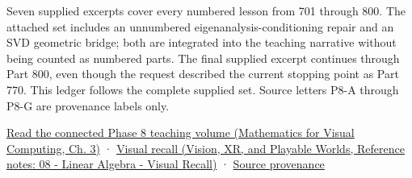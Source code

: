 \hypertarget{appendix-fd090d982a15-phase-8---parts-701-800}{}

Seven supplied excerpts cover every numbered lesson from 701 through 800. The attached set includes an unnumbered eigenanalysis-conditioning repair and an SVD geometric bridge; both are integrated into the teaching narrative without being counted as numbered parts. The final supplied excerpt continues through Part 800, even though the request described the current stopping point as Part 770. This ledger follows the complete supplied set. Source letters P8-A through P8-G are provenance labels only.

\href{../02-Mathematics-for-Visual-Computing/main.pdf\#nameddest=01-foundations-i-ch019-the-graphics-problem-hiding-inside-a-matrix-equation}{Read the connected Phase 8 teaching volume (Mathematics for Visual Computing, Ch. 3)} · \href{../07-Vision-XR-and-Playable-Worlds/main.pdf\#nameddest=appendix-932cf7182ff1}{Visual recall (Vision, XR, and Playable Worlds, Reference notes: 08 - Linear Algebra - Visual Recall)} · \hyperref[appendix-a103e7846d21-phase-8---source-analysis-and-verification]{Source provenance}

